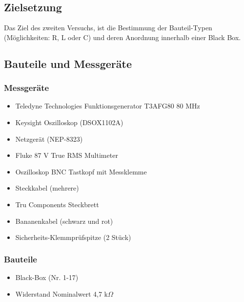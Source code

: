 \documentclass[a4paper,12pt]{article}
\begin{document}
\subsection{Zielsetzung}
Das Ziel des zweiten Versuchs, ist die Bestimmung der Bauteil-Typen (Möglichkeiten: R, L oder C) und deren Anordnung innerhalb einer
Black Box.

\subsection{Bauteile und Messgeräte}
\subsubsection*{Messgeräte}
\begin{itemize}
\item Teledyne Technologies Funktionsgenerator T3AFG80 80 MHz
\item Keysight Oszilloskop (DSOX1102A)
\item Netzgerät (NEP-8323)
\item Fluke 87 V True RMS Multimeter
\item Oszilloskop BNC Tastkopf mit Messklemme
\item Steckkabel (mehrere)
\item Tru Components Steckbrett
\item Bananenkabel (schwarz und rot)
\item Sicherheits-Klemmprüfspitze (2 Stück)
\end{itemize}

\subsubsection*{Bauteile}
\begin{itemize}
\item Black-Box (Nr. 1-17)
\item Widerstand Nominalwert 4,7 k$\Omega$
\end{itemize}
\end{document}
